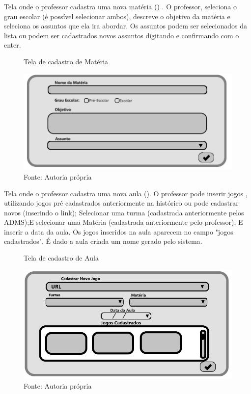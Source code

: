 \documentclass{utfpr-pg}
\begin{document}
    Tela onde o professor cadastra uma nova matéria () . O professor, seleciona o grau escolar (é possível selecionar ambos), descreve o objetivo da matéria e seleciona os assuntos que ela ira abordar. Os assuntos podem ser selecionados da lista ou podem ser cadastrados novos assuntos digitando e confirmando com o enter. 
       
        \begin{figure}[H]
            \centering
            \captionsetup{width=0.9\textwidth}
            \caption{Tela de cadastro de Matéria}
            \includegraphics[width=\linewidth]{fotos/7.jpg}
            \caption*{Fonte: Autoria própria}
            \label{fig:7}
        \end{figure}
    
    Tela onde o professor cadastra uma nova aula (). O professor pode inserir jogos , utilizando jogos pré cadastrados anteriormente na histórico ou pode cadastrar novos (inserindo o link); Selecionar uma turma (cadastrada anteriormente pelos ADMS);E selecionar uma Matéria (cadastrada anteriormente pelo professor); E inserir a data da aula. Os jogos inseridos na aula aparecem no campo "jogos cadastrados". É dado a aula criada um nome gerado pelo sistema.
      \begin{figure}[H]
            \centering
            \captionsetup{width=0.9\textwidth}
            \caption{Tela de cadastro de Aula}
            \includegraphics[width=\linewidth]{fotos/8.jpg}
            \caption*{Fonte: Autoria própria}
            \label{fig:8}
        \end{figure}
        
\end{document}

